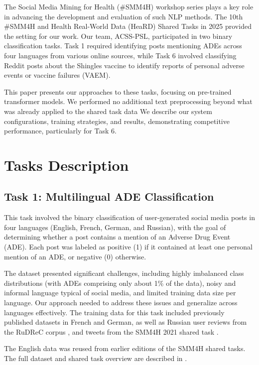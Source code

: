 \documentclass[letterpaper]{article} %
\begin{document}
The Social Media Mining for Health (\#SMM4H) workshop series plays a key role in advancing the development and evaluation of such NLP methods.
The 10th \#SMM4H and Health Real-World Data (HeaRD) Shared Tasks in 2025 \cite{smm4h-heard-overview-2025} provided the setting for our work.
Our team, ACSS-PSL, participated in two binary classification tasks. Task 1 required identifying posts mentioning ADEs across four languages from various online sources, while Task 6 involved classifying Reddit posts about the Shingles vaccine to identify reports of personal adverse events or vaccine failures (VAEM).


This paper presents our approaches to these tasks, focusing on pre-trained transformer models. We performed no additional text preprocessing beyond what was already applied to the shared task data
We describe our system configurations, training strategies, and results, demonstrating competitive performance, particularly for Task 6.

\section{Tasks Description}

\subsection{Task 1: Multilingual ADE Classification}

This task involved the binary classification of user-generated social media posts in four languages (English, French, German, and Russian), with the goal of determining whether a post contains a mention of an Adverse Drug Event (ADE).
Each post was labeled as positive (1) if it contained at least one personal mention of an ADE, or negative (0) otherwise.

The dataset presented significant challenges, including highly imbalanced class distributions (with ADEs comprising only about 1\% of the data), noisy and informal language typical of social media, and limited training data size per language. Our approach needed to address these issues and generalize across languages effectively.
The training data for this task included previously published datasets in French and German, as well as Russian user reviews from the RuDReC corpus \cite{tutubalina2020russian}, and tweets from the SMM4H 2021 shared task \cite{magge-etal-2021-overview}.

The English data was reused from earlier editions of the SMM4H shared tasks. The full dataset and shared task overview are described in \cite{smm4h-heard-overview-2025}.\\
\\
\end{document}
